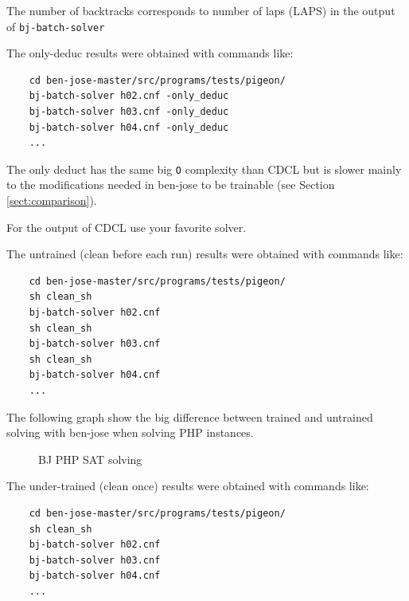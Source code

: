 \documentclass{easychair}
\begin{document}
The number of backtracks corresponds to number of laps (LAPS) in the output of \texttt{bj-batch-solver}

The only-deduc results were obtained with commands like:

\begin{verbatim}
	cd ben-jose-master/src/programs/tests/pigeon/
	bj-batch-solver h02.cnf -only_deduc
	bj-batch-solver h03.cnf -only_deduc
	bj-batch-solver h04.cnf -only_deduc
	...
\end{verbatim}

The only deduct has the same big \texttt{O} complexity than CDCL but is slower mainly to the modifications needed in ben-jose to be trainable (see Section \ref{sect:comparison}).

For the output of CDCL use your favorite solver.

The untrained (clean before each run) results were obtained with commands like:

\begin{verbatim}
	cd ben-jose-master/src/programs/tests/pigeon/
	sh clean_sh
	bj-batch-solver h02.cnf
	sh clean_sh
	bj-batch-solver h03.cnf
	sh clean_sh
	bj-batch-solver h04.cnf
	...
\end{verbatim}


The following graph show the big difference between trained and untrained solving with ben-jose when solving PHP instances.

\begin{figure}[H]
	\begin{centering}
		\caption{BJ PHP SAT solving}
		\label{fig:results-2}
	\end{centering}
\end{figure}



The under-trained (clean once) results were obtained with commands like:

\begin{verbatim}
	cd ben-jose-master/src/programs/tests/pigeon/
	sh clean_sh
	bj-batch-solver h02.cnf
	bj-batch-solver h03.cnf
	bj-batch-solver h04.cnf
	...
\end{verbatim}
\end{document}
